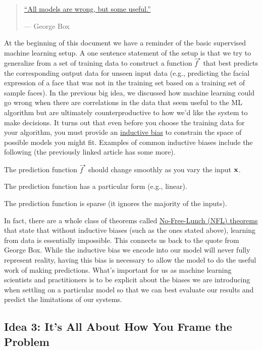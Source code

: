 \documentclass[assignment01_Solutions]{subfiles}
\begin{document}
\begin{quotation}
\href{https://en.wikipedia.org/wiki/All_models_are_wrong}{``All models are wrong, but some useful.''}

--- George Box
\end{quotation}

At the beginning of this document we have a reminder of the basic supervised machine learning setup.  A one sentence statement of the setup is that we try to generalize from a set of training data to construct a function $\hat{f}^\star$ that best predicts the corresponding output data for unseen input data (e.g., predicting the facial expression of a face that was not in the training set based on a training set of sample faces).  In the previous big idea, we discussed how machine learning could go wrong when there are correlations in the data that seem useful to the ML algorithm but are ultimately counterproductive to how we'd like the system to make decisions.  It turns out that even before you choose the training data for your algorithm, you must provide an \href{https://en.wikipedia.org/wiki/Inductive_bias}{inductive bias} to constrain the space of possible models you might fit.  Examples of common inductive biases include the following (the previously linked article has some more).
\be
\item The prediction function $\hat{f}^\star$ should change smoothly as you vary the input $\mathbf{x}$.
\item The prediction function has a particular form (e.g., linear).
\item The prediction function is sparse (it ignores the majority of the inputs).
\ee

In fact, there are a whole class of theorems called \href{https://en.wikipedia.org/wiki/No_free_lunch_theorem}{No-Free-Lunch (NFL) theorems} that state that without inductive biases (such as the ones stated above), learning from data is essentially impossible.  This connects us back to the quote from George Box.  While the inductive bias we encode into our model will never fully represent reality, having this bias is necessary to allow the model to do the useful work of making predictions.  What's important for us as machine learning scientists and practitioners is to be explicit about the biases we are introducing when settling on a particular model so that we can best evaluate our results and predict the limitations of our systems.

\subsection*{Idea 3: It's All About How You Frame the Problem}
\end{document}

